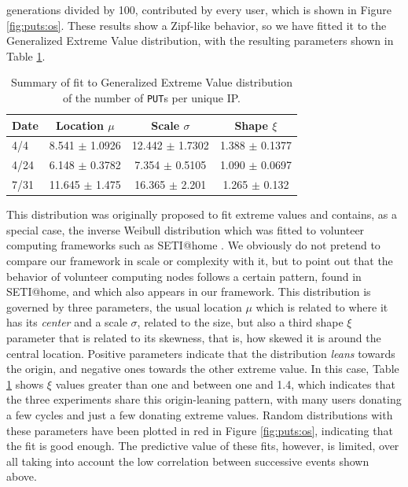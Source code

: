 \documentclass[journal,onecolumn]{IEEEtran}
\begin{document}
generations divided by 100, contributed by every user, which is shown
in Figure \ref{fig:puts:os}. These results show a Zipf-like behavior,
so we have fitted it to the Generalized Extreme Value distribution,
with the resulting parameters shown in Table \ref{tab:puts:os}.
%
\begin{table}
\caption{Summary of fit to Generalized Extreme Value distribution of
  the number of {\tt PUT}s per unique IP. \label{tab:puts:os}}
\begin{center}
\begin{tabular}{l|ccc}
\hline
Date  & Location $\mu$ & Scale $\sigma$ & Shape $\xi$ \\
\hline
4/4 &  8.541 $\pm$ 1.0926  &    12.442 $\pm$ 1.7302 &  1.388 $\pm$
0.1377 \\
4/24 & 6.148 $\pm$ 0.3782 & 7.354 $\pm$ 0.5105 & 1.090 $\pm$  0.0697  \\
7/31 & 11.645 $\pm$ 1.475 & 16.365 $\pm$ 2.201 &  1.265 $\pm$ 0.132   \\
\hline
\end{tabular}
\end{center}
\end{table}
%
This distribution was originally proposed to fit extreme values
\cite{resnick2013extreme} and contains, as a special case, the inverse
Weibull distribution which was fitted to volunteer computing
frameworks such as SETI@home \cite{javadi2009mining}. We obviously do
not pretend to compare our framework in scale or complexity with it, but
to point out that the behavior of volunteer computing nodes follows a
certain pattern, found in SETI@home, and which also appears in our framework. This
distribution is governed by three parameters, the usual location $\mu$
which is related to where it has its {\em center} and a scale $\sigma$,
related to the size, but also a third shape $\xi$ parameter that is
related to its skewness, that is, how skewed it is around the central
location. Positive parameters indicate that the distribution {\em
  leans} towards the origin, and negative ones towards the other extreme
value. In this case, Table \ref{tab:puts:os} shows $\xi$ values
greater than one and between one and 1.4, which indicates that the
three experiments share this origin-leaning pattern, with many users
donating a few cycles and just a few donating extreme values. Random
distributions with these parameters have been plotted in red in
Figure \ref{fig:puts:os}, indicating that the fit is good enough. The
predictive value of these fits, however, is limited, over all taking
into account the low correlation between successive events shown
above.
\end{document}

